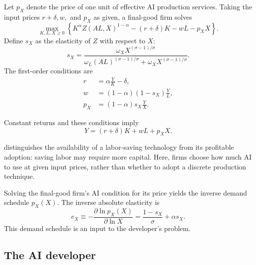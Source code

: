 Let \(p_X\) denote the price of one unit of effective AI production services. Taking the input prices \(r+\delta,w,\) and \(p_X\) as given, a final-good firm solves
\begin{equation}
 \max_{K,L,X\geq0}
 \left\{K^\alpha Z(AL,X)^{1-\alpha}-(r+\delta)K-wL-p_XX\right\}.
 \label{eq:rewrite-final-firm-problem}
\end{equation}
Define $s_X$ as the elasticity of $Z$ with respect to $X$:
\begin{equation}
 s_X=\frac{\omega_XX^{(\sigma-1)/\sigma}}
 {\omega_L(AL)^{(\sigma-1)/\sigma}
 +\omega_XX^{(\sigma-1)/\sigma}}.
 \label{eq:rewrite-sx}
\end{equation}
The first-order conditions are
\begin{align}
 r&=\alpha\frac{Y}{K}-\delta,
 \label{eq:rewrite-capital-return}\\
 w&=(1-\alpha)(1-s_X)\frac{Y}{L},
 \label{eq:rewrite-wage}\\
 p_X&=(1-\alpha)s_X\frac{Y}{X}.
 \label{eq:rewrite-ai-price}
\end{align}

Constant returns and these conditions imply
\begin{equation}
 Y=(r+\delta)K+wL+p_XX.
 \label{eq:rewrite-final-zero-profit}
\end{equation}

\citet{zeira1998} distinguishes the availability of a labor-saving
technology from its profitable adoption: saving labor may require more
capital. Here, firms choose how much AI to use at given input prices,
rather than whether to adopt a discrete production technique.

Solving the final-good firm's AI condition for its price yields the inverse
demand schedule $p_X(X)$. %
The inverse absolute elasticity is
\begin{equation}
 e_X\equiv-
 \frac{\partial\ln p_X(X)}{\partial\ln X}
 =\frac{1-s_X}{\sigma}+\alpha s_X.
 \label{eq:rewrite-inverse-demand-elasticity}
\end{equation}
This demand schedule is an input to the developer's problem.

\subsection{The AI developer}
\label{subsec:rewrite-developer}

